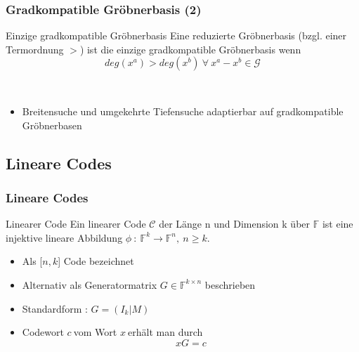 \documentclass{beamer}
\begin{document}

\begin{frame}[<+->]
\frametitle{Gradkompatible Gröbnerbasis (2)}


\begin{block}{Einzige gradkompatible Gröbnerbasis}
Eine reduzierte Gröbnerbasis (bzgl. einer Termordnung $>$) ist die einzige gradkompatible Gröbnerbasis wenn 
\[ deg(x^{a}) > deg(x^{b})~ \forall~ x^{a}-x^{b}\in \mathcal{G} \] 

\end{block}
~\\
\begin{itemize}
\item Breitensuche und umgekehrte Tiefensuche adaptierbar auf gradkompatible Gröbnerbasen
\end{itemize}

\end{frame}


\subsection{Lineare Codes}

\begin{frame}[<+->]
\frametitle{Lineare Codes}


\begin{block}{Linearer Code}
Ein linearer Code $\mathcal{C}$  der Länge n und Dimension k über $\mathbb{F}$ ist eine injektive lineare Abbildung  $\phi~:~\mathbb{F}^{k} \rightarrow \mathbb{F}^{n},~n\geq k $.
\end{block}

\begin{itemize}
\item Als [$n,k$] Code bezeichnet
\item Alternativ als Generatormatrix $G \in \mathbb{F}^{k \times n}$ beschrieben 
~\\
\item Standardform : $G = (I_{k}| M)$ %
\item Codewort $c~$vom Wort $x~$erhält man durch 
\[
     xG = c 
 \]
\end{itemize}

\end{frame}
\end{document}
